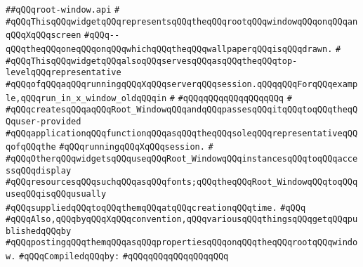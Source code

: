 \label{src/lib/x-kit/widget/lib/root-window.api}
\verb|##qQQqroot-window.api|\newline
\verb|#|\newline
\verb|#qQQqThisqQQqwidgetqQQqrepresentsqQQqtheqQQqrootqQQqwindowqQQqonqQQqanqQQqXqQQqscreen|\newline
\verb|#qQQq--qQQqtheqQQqoneqQQqonqQQqwhichqQQqtheqQQqwallpaperqQQqisqQQqdrawn.|\newline
\verb|#|\newline
\verb|#qQQqThisqQQqwidgetqQQqalsoqQQqservesqQQqasqQQqtheqQQqtop-levelqQQqrepresentative|\newline
\verb|#qQQqofqQQqaqQQqrunningqQQqXqQQqserverqQQqsession.qQQqqQQqForqQQqexample,qQQqrun_in_x_window_oldqQQqin|\newline
\verb|#|\newline
\verb|#qQQqqQQqqQQqqQQqqQQq|\newline
\verb|#|\newline
\verb|#qQQqcreatesqQQqaqQQqRoot_WindowqQQqandqQQqpassesqQQqitqQQqtoqQQqtheqQQquser-provided|\newline
\verb|#qQQqapplicationqQQqfunctionqQQqasqQQqtheqQQqsoleqQQqrepresentativeqQQqofqQQqthe|\newline
\verb|#qQQqrunningqQQqXqQQqsession.|\newline
\verb|#|\newline
\verb|#qQQqOtherqQQqwidgetsqQQquseqQQqRoot_WindowqQQqinstancesqQQqtoqQQqaccessqQQqdisplay|\newline
\verb|#qQQqresourcesqQQqsuchqQQqasqQQqfonts;qQQqtheqQQqRoot_WindowqQQqtoqQQquseqQQqisqQQqusually|\newline
\verb|#qQQqsuppliedqQQqtoqQQqthemqQQqatqQQqcreationqQQqtime.|\newline
\verb|#qQQq|\newline
\verb|#qQQqAlso,qQQqbyqQQqXqQQqconvention,qQQqvariousqQQqthingsqQQqgetqQQqpublishedqQQqby|\newline
\verb|#qQQqpostingqQQqthemqQQqasqQQqpropertiesqQQqonqQQqtheqQQqrootqQQqwindow.|\newline
\newline
\verb|#qQQqCompiledqQQqby:|\newline
\verb|#qQQqqQQqqQQqqQQqqQQq|\newline
\newline
